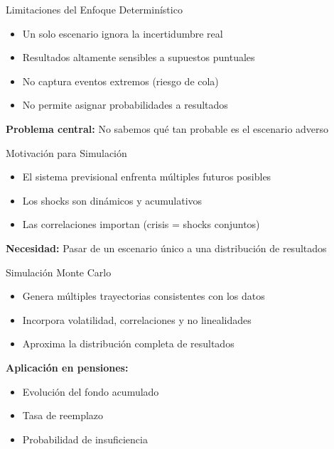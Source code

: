 \documentclass{beamer}
\begin{document}
\begin{frame}{Limitaciones del Enfoque Determinístico}

\begin{itemize}
\item Un solo escenario ignora la incertidumbre real
\item Resultados altamente sensibles a supuestos puntuales
\item No captura eventos extremos (riesgo de cola)
\item No permite asignar probabilidades a resultados
\end{itemize}

\vspace{0.4cm}

\textbf{Problema central:}  
No sabemos qué tan probable es el escenario adverso

\end{frame}
\begin{frame}{Motivación para Simulación}

\begin{itemize}
\item El sistema previsional enfrenta múltiples futuros posibles
\item Los shocks son dinámicos y acumulativos
\item Las correlaciones importan (crisis = shocks conjuntos)
\end{itemize}

\vspace{0.4cm}

\textbf{Necesidad:}  
Pasar de un escenario único a una distribución de resultados

\end{frame}
\begin{frame}{Simulación Monte Carlo}

\begin{itemize}
\item Genera múltiples trayectorias consistentes con los datos
\item Incorpora volatilidad, correlaciones y no linealidades
\item Aproxima la distribución completa de resultados
\end{itemize}

\vspace{0.4cm}

\textbf{Aplicación en pensiones:}
\begin{itemize}
\item Evolución del fondo acumulado
\item Tasa de reemplazo
\item Probabilidad de insuficiencia
\end{itemize}

\end{frame}
\end{document}
